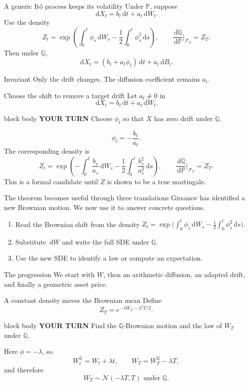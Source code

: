 \documentclass[handout,10pt,aspectratio=169]{beamer}
\newenvironment{pausebox}{\begin{beamercolorbox}[rounded=true,sep=0.8em,wd=\textwidth]{block body}
  \textbf{\color{CourseGold}YOUR TURN}\quad}{\end{beamercolorbox}}
\newcommand{\dd}{\,\mathrm d}
\newcommand{\Pp}{\mathbb P}
\newcommand{\Q}{\mathbb Q}
\newcommand{\cF}{\mathcal F}
\newcommand{\1}{\mathbf 1}
\newcommand{\Nlaw}{\mathcal N}
\begin{document}
\begin{frame}{A generic It\^o process keeps its volatility}
Under \(\Pp\), suppose
\[
\dd X_t=b_t\dd t+a_t\dd W_t.
\]
Use the density
\[
Z_t=\exp\!\left(\int_0^t\phi_s\dd W_s
-\frac12\int_0^t\phi_s^2\dd s\right),
\qquad \frac{\dd\Q}{\dd\Pp}\bigg|_{\cF_T}=Z_T.
\]
Then under \(\Q\),
\[
\boxed{
\dd X_t=(b_t+a_t\phi_t)\dd t+a_t\dd B_t.}
\]
\begin{exampleblock}{Invariant}
Only the drift changes. The diffusion coefficient remains \(a_t\).
\end{exampleblock}
\end{frame}

\begin{frame}{Choose the shift to remove a target drift}
Let \(a_t\ne0\) in
\[
\dd X_t=b_t\dd t+a_t\dd W_t.
\]
\begin{pausebox}
Choose \(\phi_t\) so that \(X\) has zero drift under \(\Q\).
\end{pausebox}

\[
\boxed{\phi_t=-\frac{b_t}{a_t}.}
\]
The corresponding density is
\[
Z_t=\exp\!\left(-\int_0^t\frac{b_s}{a_s}\dd W_s
-\frac12\int_0^t\frac{b_s^2}{a_s^2}\dd s\right),
\qquad \frac{\dd\Q}{\dd\Pp}\bigg|_{\cF_T}=Z_T.
\]
This is a formal candidate until \(Z\) is shown to be a true martingale.
\end{frame}

\begin{frame}{The theorem becomes useful through three translations}
Girsanov has identified a new Brownian motion. We now use it to answer
concrete questions.
\begin{enumerate}
  \item Read the Brownian shift from the density
  \(Z_t=\exp\!\bigl(\int_0^t\phi_s\dd W_s
  -\frac12\int_0^t\phi_s^2\dd s\bigr)\).
  \item Substitute \(\dd W\) and write the full SDE under \(\Q\).
  \item Use the new SDE to identify a law or compute an expectation.
\end{enumerate}
\begin{block}{The progression}
We start with \(W\), then an arithmetic diffusion, an adapted drift, and
finally a geometric asset price.
\end{block}
\end{frame}

\begin{frame}{A constant density moves the Brownian mean}
Define
\[
Z_T=e^{-\lambda W_T-\lambda^2T/2}.
\]
\begin{pausebox}
Find the \(\Q\)-Brownian motion and the law of \(W_T\) under \(\Q\).
\end{pausebox}

Here \(\phi=-\lambda\), so
\[
W_t^\Q=W_t+\lambda t,\qquad W_T=W_T^\Q-\lambda T,
\]
and therefore
\[
\boxed{W_T\sim\Nlaw(-\lambda T,T)\text{ under }\Q.}
\]
\end{frame}
\end{document}

